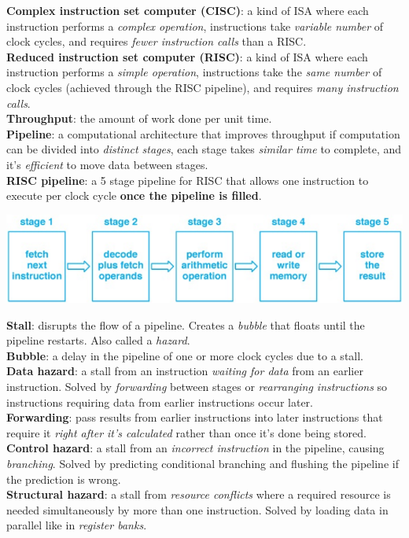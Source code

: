 \documentclass[10pt,landscape]{article}
\begin{document}
\begin{multicols}{3}
\textbf{Complex instruction set computer (CISC)}: a kind of ISA where each instruction performs a \textit{complex operation}, instructions take \textit{variable number} of clock cycles, and requires \textit{fewer instruction calls} than a RISC.\\
\textbf{Reduced instruction set computer (RISC)}:  a kind of ISA where each instruction performs a \textit{simple operation}, instructions take the \textit{same number} of clock cycles (achieved through the RISC pipeline), and requires \textit{many instruction calls}.\\
\textbf{Throughput}: the amount of work done per unit time.\\
\textbf{Pipeline}: a computational architecture that improves throughput if computation can be divided into \textit{distinct stages}, each stage takes \textit{similar time} to complete, and it's \textit{efficient} to move data between stages.\\
\textbf{RISC pipeline}: a 5 stage pipeline for RISC that allows one instruction to execute per clock cycle \textbf{once the pipeline is filled}.\\
{\centering\includegraphics[scale=0.39]{img/rp.png}\par}
\textbf{Stall}: disrupts the flow of a pipeline. Creates a \textit{bubble} that floats until the pipeline restarts. Also called a \textit{hazard}.\\
\textbf{Bubble}: a delay in the pipeline of one or more clock cycles due to a stall.\\
\textbf{Data hazard}: a stall from an instruction \textit{waiting for data} from an earlier instruction. Solved by \textit{forwarding} between stages or \textit{rearranging instructions} so instructions requiring data from earlier instructions occur later. \\
\textbf{Forwarding}: pass results from earlier instructions into later instructions that require it \textit{right after it's calculated} rather than once it's done being stored.\\
\textbf{Control hazard}: a stall from an \textit{incorrect instruction} in the pipeline, causing \textit{branching}. Solved by predicting conditional branching and flushing the pipeline if the prediction is wrong.\\
\textbf{Structural hazard}: a stall from \textit{resource conflicts} where a required resource is needed simultaneously by more than one instruction. Solved by loading data in parallel like in \textit{register banks}.\\

\end{multicols}
\end{document}
